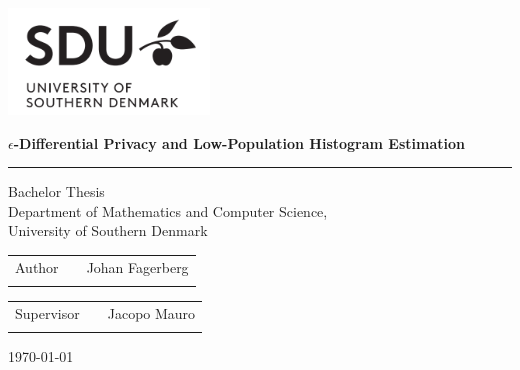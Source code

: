 \begin{titlepage}
\Large
\includegraphics[width=0.4\textwidth]{imgs/logo.png}
\renewcommand{\thepage}{Title}
\thispagestyle{empty}
       \begin{center}
       \vspace*{1cm}
\linespread{1.25}
       {\doublespacing \Huge\textbf{$\epsilon$-Differential Privacy and Low-Population Histogram Estimation}}
\linespread{1}
       \rule{\linewidth}{1pt}
       {\huge Bachelor Thesis \\
       \Large Department of Mathematics and Computer Science, \\
       University of Southern Denmark}
\end{center}
\vspace{6cm}
\Large
\begin{tabularx}{\textwidth}{lXr}
Author & & Johan Fagerberg \\ \\
\end{tabularx}
\begin{tabularx}{\textwidth}{lXr}
Supervisor & & Jacopo Mauro\\ \\
\end{tabularx}

\vfill
\large \today
\end{titlepage}
